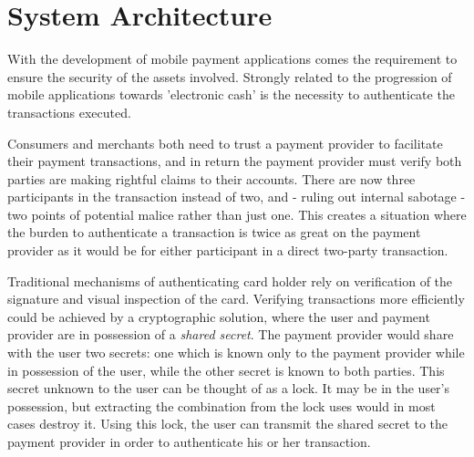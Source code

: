 \section{System Architecture}
\label{chap:hardware_architecture}
With the development of mobile payment applications comes the requirement to ensure the security of the assets involved.
Strongly related to the progression of mobile applications towards 'electronic cash' is the necessity to authenticate the transactions executed. \cite{herzberg2003payments}


Consumers and merchants both need to trust a payment provider to facilitate their payment transactions, and in return the payment provider must verify both parties are making rightful claims to their accounts.
There are now three participants in the transaction instead of two, and - ruling out internal sabotage - two points of potential malice rather than just one.
This creates a situation where the burden to authenticate a transaction is twice as great on the payment provider as it would be for either participant in a direct two-party transaction.

Traditional mechanisms of authenticating card holder rely on verification of the signature and visual inspection of the card.
Verifying transactions more efficiently could be achieved by a cryptographic solution, where the user and payment provider are in possession of a \textit{shared secret}.
The payment provider would share with the user two secrets: one which is known only to the payment provider while in possession of the user, while the other secret is known to both parties.
This secret unknown to the user can be thought of as a lock.
It may be in the user's possession, but extracting the combination from the lock uses would in most cases destroy it.
Using this lock, the user can transmit the shared secret to the payment provider in order to authenticate his or her transaction.



